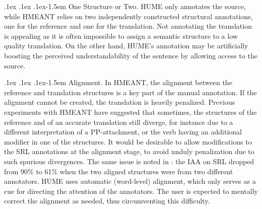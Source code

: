 \documentclass[11pt,letterpaper]{article}
\makeatletter
\renewcommand{\paragraph}{
  \@startsection{paragraph}{4}
  {\z@}{.1ex \@plus .1ex \@minus .1ex}{-1.5em}
  {\normalfont\normalsize\bfseries}
}
\def\parcite#1{\cite{#1}}
\makeatother
\begin{document}
\paragraph{One Structure or Two.}
HUME only annotates the source, while HMEANT relies on
two independently constructed structural annotations, one for the reference and one
for the translation.
Not annotating the translation is appealing as it is often impossible to assign a
semantic structure to a low quality translation.
On the other hand, HUME's annotation may be artificially boosting the perceived understandability
of the sentence by allowing access to the source.


\paragraph{Alignment.}
In HMEANT, the alignment between the reference and translation structures is a key
part of the manual annotation. If the alignment cannot be created, the 
translation is heavily penalized.
Previous experiments with HMEANT
\parcite{bojar:wu:ssst:2012,chuchunkov-tarelkin-galinskaya:2014:SSST-8} have
suggested that sometimes, the structures of the reference and of an accurate translation
still diverge, for instance due to a different
interpretation of a PP-attachment, or the verb having an additional modifier in
one of the structures. It would be desirable to allow modifications to
the SRL annotations at the alignment stage,
to avoid unduly penalization due to such spurious divergences.
The same issue is noted in \parcite{lo:wu:reliability:2014}:
the IAA on SRL dropped from 90\% to 61\% 
when the two aligned structures were from two different annotators.
HUME uses automatic (word-level) alignment, which only
serves as a cue for directing the attention of the annotators.
The user is expected to mentally correct the
alignment as needed, thus circumventing this difficulty.
\end{document}
